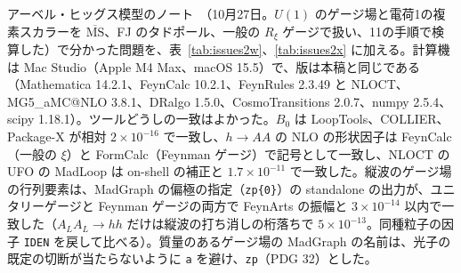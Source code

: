 \documentclass[a4paper,10pt]{ltjsarticle}
\makeatletter
\newcommand{\MGaMC}{MG5\_aMC@NLO}
\makeatother
\begin{document}
アーベル・ヒッグス模型のノート~\cite{ahnote}（10月27日。$U(1)$ のゲージ場と電荷1の複素スカラーを $\overline{\mathrm{MS}}$、FJ のタドポール、一般の $R_\xi$ ゲージで扱い、11の手順で検算した）で分かった問題を、表~\ref{tab:issues2w}、\ref{tab:issues2x} に加える。計算機は Mac Studio（Apple M4 Max、macOS 15.5）で、版は本稿と同じである（Mathematica 14.2.1、FeynCalc 10.2.1、FeynRules 2.3.49 と NLOCT、\MGaMC{} 3.8.1、DRalgo 1.5.0、CosmoTransitions 2.0.7、numpy 2.5.4、scipy 1.18.1）。ツールどうしの一致はよかった。$B_0$ は LoopTools、COLLIER、Package-X が相対 $2\times10^{-16}$ で一致し、$h\to AA$ の NLO の形状因子は FeynCalc（一般の $\xi$）と FormCalc（Feynman ゲージ）で記号として一致し、NLOCT の UFO の MadLoop は on-shell の補正と $1.7\times10^{-11}$ で一致した。縦波のゲージ場の行列要素は、MadGraph の偏極の指定（\texttt{zp\{0\}}）の standalone の出力が、ユニタリーゲージと Feynman ゲージの両方で FeynArts の振幅と $3\times10^{-14}$ 以内で一致した（$A_LA_L\to hh$ だけは縦波の打ち消しの桁落ちで $5\times10^{-13}$。同種粒子の因子 \texttt{IDEN} を戻して比べる）。質量のあるゲージ場の MadGraph の名前は、光子の既定の切断が当たらないように \texttt{a} を避け、\texttt{zp}（PDG 32）とした。
\end{document}
